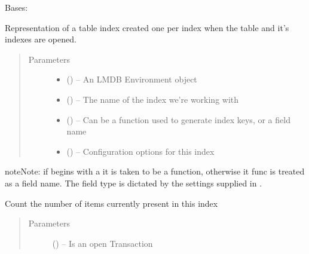 \documentclass[letterpaper,10pt,english]{sphinxmanual}
\begin{document}
\begin{fulllineitems}
\label{\detokenize{index:mamba.Index}}
Bases: 

Representation of a table index created one per index when the table and it's indexes are opened.
\begin{quote}\begin{description}
\item[{Parameters}] \leavevmode\begin{itemize}
\item {} 
 () -- An LMDB Environment object

\item {} 
 () -- The name of the index we're working with

\item {} 
 () -- Can be a function used to generate index keys, or a field name

\item {} 
 () -- Configuration options for this index

\end{itemize}

\end{description}\end{quote}

\begin{sphinxadmonition}{note}{Note:}
if  begins with a \sphinxstylestrong{!} it is taken to be a function, otherwise
it func is treated as a field name. The field type is dictated by the settings
supplied in .
\end{sphinxadmonition}

\begin{fulllineitems}
\label{\detokenize{index:mamba.Index.count}}
Count the number of items currently present in this index
\begin{quote}\begin{description}
\item[{Parameters}] \leavevmode
{} () -- Is an open Transaction


\end{description}
\end{quote}
\end{fulllineitems}
\end{fulllineitems}
\end{document}
